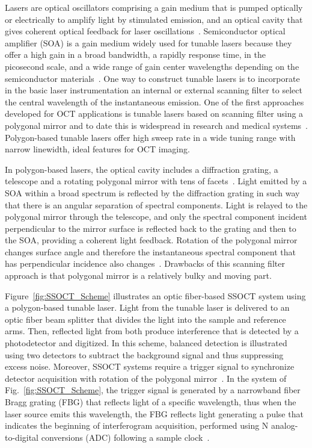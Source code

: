 Lasers are optical oscillators comprising a gain medium that is pumped optically or electrically to amplify light by stimulated emission, and an optical cavity that gives coherent optical feedback for laser oscillations~\cite{Saleh1991_Fundamentals}. Semiconductor optical amplifier (SOA) is a gain medium widely used for tunable lasers because they offer a high gain in a broad bandwidth, a rapidly response time, in the picosecond scale, and a wide range of gain center wavelengths depending on the semiconductor materials~\cite{Yun2015_Wavelength}. One way to construct tunable lasers is to incorporate in the basic laser instrumentation an internal or external scanning filter to select the central wavelength of the instantaneous emission. One of the first approaches developed for OCT applications is tunable lasers based on scanning filter using a polygonal mirror and to date this is widespread in research and medical systems~\cite{Yun2003_Highspeed}. Polygon-based tunable lasers offer high sweep rate in a wide tuning range with narrow linewidth, ideal features for OCT imaging.

In polygon-based lasers, the optical cavity includes a diffraction grating, a telescope and a rotating polygonal mirror with tens of facets~\cite{Yun2003_Highspeed}. Light emitted by a SOA within a broad spectrum is reflected by the diffraction grating in such way that there is an angular separation of spectral components. Light is relayed to the polygonal mirror through the telescope, and only the spectral component incident perpendicular to the mirror surface is reflected back to the grating and then to the SOA, providing a coherent light feedback. Rotation of the polygonal mirror changes surface angle and therefore the instantaneous spectral component that has perpendicular incidence also changes~\cite{Yun2003_Highspeed}. Drawbacks of this scanning filter approach is that polygonal mirror is a relatively bulky and moving part.

Figure~\ref{fig:SSOCT_Scheme} illustrates an optic fiber-based SSOCT system using a polygon-based tunable laser. Light from the tunable laser is delivered to an optic fiber beam splitter that divides the light into the sample and reference arms. Then, reflected light from both produce interference that is detected by a photodetector and digitized. In this scheme, balanced detection is illustrated using two detectors to subtract the background signal and thus suppressing excess noise\cite{Podoleanu2000_Unbalanced}. Moreover, SSOCT systems require a trigger signal to synchronize detector acquisition with rotation of the polygonal mirror~\cite{Vakoc2005_Phaseresolved}. In the system of Fig.~\ref{fig:SSOCT_Scheme}, the trigger signal is generated by a narrowband fiber Bragg grating (FBG) that reflects light of a specific wavelength, thus when the laser source emits this wavelength, the FBG reflects light generating a pulse that indicates the beginning of interferogram acquisition, performed using N analog-to-digital conversions (ADC) following a sample clock~\cite{Vakoc2005_Phaseresolved}.

